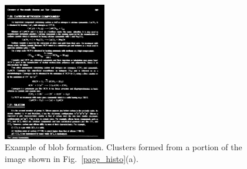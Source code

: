 \documentclass[12pt]{IEEEtran}
\begin{document}
\begin{itemize}
\begin{figure}[h]\center\footnotesize
 \includegraphics[width=0.4\textwidth]{wordBlob.png} 
  \caption{Example of blob formation. Clusters formed from a portion of the image shown in
Fig.~\ref{page_histo}(a).}
 \label{word_blob}
\end{figure}


                   


\end{itemize}
\end{document}

